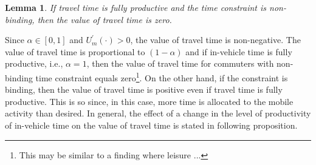 \documentclass[12pt,a4paper,british]{article}
\newtheorem{lemma}{Lemma}[section]
\begin{document}

\begin{lemma}
If travel time is fully productive and the time constraint is non-binding, then the value of travel time is zero.
\end{lemma}


Since $\alpha \in \left[0, 1 \right]$ and $U_{m}^{\prime}\left( \cdot \right) > 0$, the value of travel time is non-negative. The value of travel time is proportional to $\left( 1 - \alpha \right)$ and if in-vehicle time is fully productive, i.e., $\alpha=1$,  then the value of travel time for commuters with non-binding time constraint equals zero\footnote{This may be similar to a finding where leisure ... }. On the other hand, if the constraint is binding, then the value of travel time is positive even if travel time is fully productive. This is so since, in this case, more time is allocated to the mobile activity than desired. In general, the effect of a change in the level of productivity of in-vehicle time on the value of travel time is stated in following proposition.



\end{document}
